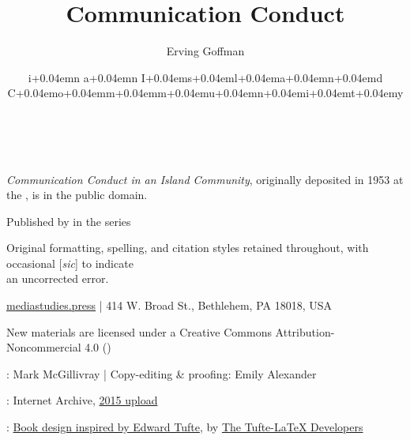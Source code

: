 \documentclass[twoside,symmetric,nobib,justified]{tufte-book}
\title[Communication Conduct in an Island Community]{Communication Conduct}
\date{i\kern+0.04emn a\kern+0.04emn I\kern+0.04ems\kern+0.04eml\kern+0.04ema\kern+0.04emn\kern+0.04emd C\kern+0.04emo\kern+0.04emm\kern+0.04emm\kern+0.04emu\kern+0.04emn\kern+0.04emi\kern+0.04emt\kern+0.04emy}
\author[Erving Goffman]{Erving Goffman}
\begin{document}
\frontmatter{}\setcounter{page}{3}

\begin{fullwidth}


\maketitle


\newpage

    




\begin{fullwidth}

~\vfill
\thispagestyle{empty}

\setlength{\parindent}{0pt}

\setlength{\parskip}{\baselineskip}
\emph{Communication Conduct in an Island Community}, originally deposited in 1953 at the , is in the public domain.

\par Published by  in the  series

\par Original formatting, spelling, and citation styles retained throughout, with occasional {[}\emph{sic}{]} to indicate\\an uncorrected error.

\href{http://mediastudies.press}{mediastudies.press} | 414 W. Broad St., Bethlehem, PA 18018, USA

\par New materials are licensed under a Creative Commons Attribution-Noncommercial 4.0 (\href{https://creativecommons.org/licenses/by-nc/4.0/legalcode}{})

\par {}: Mark McGillivray | Copy-editing \& proofing: Emily Alexander

\par {}: Internet Archive, \href{https://archive.org/details/GOFFMAN1953CommunicationConductInAnIslandCommunity}{2015 upload}

\par {}: \href{https://www.overleaf.com/latex/templates/book-design-inspired-by-edward-tufte/gcfbtdjfqdjh}{Book design inspired by Edward Tufte}, by \href{https://ctan.org/pkg/tufte-latex}{The Tufte-LaTeX Developers}


\end{fullwidth}
\end{fullwidth}
\end{document}
